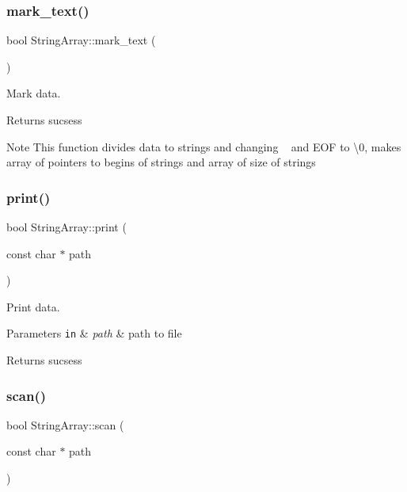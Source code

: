 \subsubsection{\texorpdfstring{mark\+\_\+text()}{mark\_text()}}
{\footnotesize\ttfamily bool String\+Array\+::mark\+\_\+text (\begin{DoxyParamCaption}{ }\end{DoxyParamCaption})}



Mark data. 

\begin{DoxyReturn}{Returns}
sucsess
\end{DoxyReturn}
\begin{DoxyNote}{Note}
This function divides data to strings and changing \textquotesingle{}~\newline
\textquotesingle{} and E\+OF to \textquotesingle{}\textbackslash{}0\textquotesingle{}, makes array of pointers to begins of strings and array of size of strings 
\end{DoxyNote}
\mbox{\label{class_string_array_a4b24347f36da4c591463d39ddbce1660}} 
\subsubsection{\texorpdfstring{print()}{print()}}
{\footnotesize\ttfamily bool String\+Array\+::print (\begin{DoxyParamCaption}\item[{const char $\ast$}]{path }\end{DoxyParamCaption})}



Print data. 


\begin{DoxyParams}[1]{Parameters}
\mbox{\tt in}  & {\em path} & path to file\\
\hline
\end{DoxyParams}
\begin{DoxyReturn}{Returns}
sucsess 
\end{DoxyReturn}
\mbox{\label{class_string_array_af548aec5f0efc6bdcb85bbc9ff3314ae}} 
\subsubsection{\texorpdfstring{scan()}{scan()}}
{\footnotesize\ttfamily bool String\+Array\+::scan (\begin{DoxyParamCaption}\item[{const char $\ast$}]{path }\end{DoxyParamCaption})}



